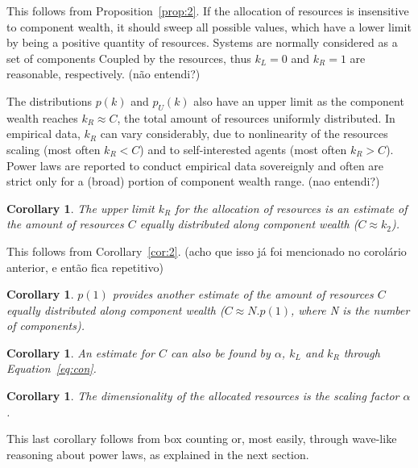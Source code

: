 \documentclass[a4paper, 11pt]{article} %
\newtheorem{corollary}[theorem2]{Corollary}
\begin{document}
This follows from Proposition~\ref{prop:2}.
If the allocation of resources is insensitive to component wealth,
it should sweep all possible values, which have a lower limit by being a positive quantity of resources.
Systems are normally considered as a set of components
Coupled by the resources,
thus $k_L=0$ and $k_R=1$ are reasonable, respectively. (não entendi?)

The distributions $p(k)$ and $p_U(k)$ also have an upper limit as the component wealth reaches $k_R \approx C$,
the total amount of resources uniformly distributed.
In empirical data, $k_R$ can vary considerably, due to
nonlinearity of the resources scaling (most often $k_R<C$) and
to self-interested agents (most often $k_R>C$).
Power laws are reported to conduct empirical data sovereignly and
often are strict only for a
(broad) portion of component wealth range. (nao entendi?)



\begin{corollary}
	The upper limit $k_R$ for the allocation of resources is an estimate of the amount of resources $C$ equally distributed along component wealth ($C\approx k_2$).
\end{corollary}

This follows from Corollary~\ref{cor:2}. (acho que isso já foi mencionado no corolário anterior, e então fica repetitivo)

\begin{corollary}
	$p(1)$ provides another estimate of the amount of resources $C$ equally distributed along component wealth ($C\approx N . p(1)$, where N is the number of components).
\end{corollary}

\begin{corollary}
	An estimate for $C$ can also be found by $\alpha$, $k_L$ and $k_R$ through Equation~\ref{eq:con}.
\end{corollary}

\begin{corollary}
	The dimensionality of the allocated resources is the scaling factor $\alpha$.
\end{corollary}

This last corollary follows from box counting or, most easily,
through wave-like reasoning about power laws, as explained in the next section.
\end{document}
